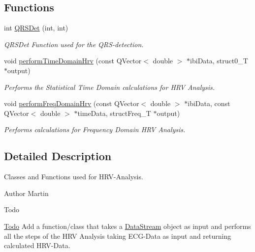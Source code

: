 \subsection*{Functions}
\begin{DoxyCompactItemize}
\item 
int \hyperlink{group__HRV-Analysis_ga5c14f0d7dd58dec49e939470bcb5db1c}{Q\+R\+S\+Det} (int, int)
\begin{DoxyCompactList}\small\item\em Q\+R\+S\+Det Function used for the Q\+R\+S-\/detection. \end{DoxyCompactList}\item 
void \hyperlink{group__HRV-Analysis_ga2bd6c358a622e01babb7fdbca313c50f}{perform\+Time\+Domain\+Hrv} (const Q\+Vector$<$ double $>$ $\ast$ibi\+Data, struct0\+\_\+T $\ast$output)
\begin{DoxyCompactList}\small\item\em Performs the Statistical Time Domain calculations for H\+RV Analysis. \end{DoxyCompactList}\item 
void \hyperlink{group__HRV-Analysis_ga3cfec29967efe1561722a05d03f26158}{perform\+Freq\+Domain\+Hrv} (const Q\+Vector$<$ double $>$ $\ast$ibi\+Data, const Q\+Vector$<$ double $>$ $\ast$time\+Data, struct\+Freq\+\_\+T $\ast$output)
\begin{DoxyCompactList}\small\item\em Performs calculations for Frequency Domain H\+RV Analysis. \end{DoxyCompactList}\end{DoxyCompactItemize}


\subsection{Detailed Description}
Classes and Functions used for H\+R\+V-\/\+Analysis. 

\begin{DoxyAuthor}{Author}
Martin 
\end{DoxyAuthor}
\begin{DoxyRefDesc}{Todo}
\item[\hyperlink{todo__todo000013}{Todo}]Add a function/class that takes a \hyperlink{classDataStream}{Data\+Stream} object as input and performs all the steps of the H\+RV Analysis taking E\+C\+G-\/\+Data as input and returning calculated H\+R\+V-\/\+Data. \end{DoxyRefDesc}


